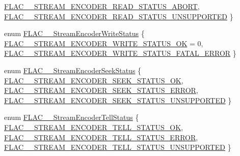 \begin{DoxyCompactItemize}
\mbox{\hyperlink{group__flac__stream__encoder_gga2e81f007fb0a7414c0bbb453f37ea37fa69b94eeab60e07d5fd33f2b3c8b85759}{F\+L\+A\+C\+\_\+\+\_\+\+S\+T\+R\+E\+A\+M\+\_\+\+E\+N\+C\+O\+D\+E\+R\+\_\+\+R\+E\+A\+D\+\_\+\+S\+T\+A\+T\+U\+S\+\_\+\+A\+B\+O\+RT}}, 
\mbox{\hyperlink{group__flac__stream__encoder_gga2e81f007fb0a7414c0bbb453f37ea37fa9bb730b8f6354cc1e810017a2f700316}{F\+L\+A\+C\+\_\+\+\_\+\+S\+T\+R\+E\+A\+M\+\_\+\+E\+N\+C\+O\+D\+E\+R\+\_\+\+R\+E\+A\+D\+\_\+\+S\+T\+A\+T\+U\+S\+\_\+\+U\+N\+S\+U\+P\+P\+O\+R\+T\+ED}}
 \}
\item 
enum \mbox{\hyperlink{group__flac__stream__encoder_ga3737471fd49730bb8cf9b182bdeda05e}{F\+L\+A\+C\+\_\+\+\_\+\+Stream\+Encoder\+Write\+Status}} \{ \mbox{\hyperlink{group__flac__stream__encoder_gga3737471fd49730bb8cf9b182bdeda05ea5622e0199f0203c402fcb7b4ca76f808}{F\+L\+A\+C\+\_\+\+\_\+\+S\+T\+R\+E\+A\+M\+\_\+\+E\+N\+C\+O\+D\+E\+R\+\_\+\+W\+R\+I\+T\+E\+\_\+\+S\+T\+A\+T\+U\+S\+\_\+\+OK}} = 0, 
\mbox{\hyperlink{group__flac__stream__encoder_gga3737471fd49730bb8cf9b182bdeda05ea18e7cd6a443fb8bd303c3ba89946bc85}{F\+L\+A\+C\+\_\+\+\_\+\+S\+T\+R\+E\+A\+M\+\_\+\+E\+N\+C\+O\+D\+E\+R\+\_\+\+W\+R\+I\+T\+E\+\_\+\+S\+T\+A\+T\+U\+S\+\_\+\+F\+A\+T\+A\+L\+\_\+\+E\+R\+R\+OR}}
 \}
\item 
enum \mbox{\hyperlink{group__flac__stream__encoder_ga6d5be3489f45fcf0c252022c65d87aca}{F\+L\+A\+C\+\_\+\+\_\+\+Stream\+Encoder\+Seek\+Status}} \{ \mbox{\hyperlink{group__flac__stream__encoder_gga6d5be3489f45fcf0c252022c65d87acaa99853066610d798627888ec2e5afa667}{F\+L\+A\+C\+\_\+\+\_\+\+S\+T\+R\+E\+A\+M\+\_\+\+E\+N\+C\+O\+D\+E\+R\+\_\+\+S\+E\+E\+K\+\_\+\+S\+T\+A\+T\+U\+S\+\_\+\+OK}}, 
\mbox{\hyperlink{group__flac__stream__encoder_gga6d5be3489f45fcf0c252022c65d87acaabf93227938b4e1bf3656fe4ba4159c60}{F\+L\+A\+C\+\_\+\+\_\+\+S\+T\+R\+E\+A\+M\+\_\+\+E\+N\+C\+O\+D\+E\+R\+\_\+\+S\+E\+E\+K\+\_\+\+S\+T\+A\+T\+U\+S\+\_\+\+E\+R\+R\+OR}}, 
\mbox{\hyperlink{group__flac__stream__encoder_gga6d5be3489f45fcf0c252022c65d87acaa8930179a426134caf30a70147448f037}{F\+L\+A\+C\+\_\+\+\_\+\+S\+T\+R\+E\+A\+M\+\_\+\+E\+N\+C\+O\+D\+E\+R\+\_\+\+S\+E\+E\+K\+\_\+\+S\+T\+A\+T\+U\+S\+\_\+\+U\+N\+S\+U\+P\+P\+O\+R\+T\+ED}}
 \}
\item 
enum \mbox{\hyperlink{group__flac__stream__encoder_gab628f63181250eb977a28bf12b7dd9ff}{F\+L\+A\+C\+\_\+\+\_\+\+Stream\+Encoder\+Tell\+Status}} \{ \mbox{\hyperlink{group__flac__stream__encoder_ggab628f63181250eb977a28bf12b7dd9ffa48e071d89494ac8f5471e7c0d7a6f43b}{F\+L\+A\+C\+\_\+\+\_\+\+S\+T\+R\+E\+A\+M\+\_\+\+E\+N\+C\+O\+D\+E\+R\+\_\+\+T\+E\+L\+L\+\_\+\+S\+T\+A\+T\+U\+S\+\_\+\+OK}}, 
\mbox{\hyperlink{group__flac__stream__encoder_ggab628f63181250eb977a28bf12b7dd9ffaf638882e04d7c58e6c29dcc7f410864b}{F\+L\+A\+C\+\_\+\+\_\+\+S\+T\+R\+E\+A\+M\+\_\+\+E\+N\+C\+O\+D\+E\+R\+\_\+\+T\+E\+L\+L\+\_\+\+S\+T\+A\+T\+U\+S\+\_\+\+E\+R\+R\+OR}}, 
\mbox{\hyperlink{group__flac__stream__encoder_ggab628f63181250eb977a28bf12b7dd9ffa9d6bbd317f85fd2d6fc72f64e3cb56e7}{F\+L\+A\+C\+\_\+\+\_\+\+S\+T\+R\+E\+A\+M\+\_\+\+E\+N\+C\+O\+D\+E\+R\+\_\+\+T\+E\+L\+L\+\_\+\+S\+T\+A\+T\+U\+S\+\_\+\+U\+N\+S\+U\+P\+P\+O\+R\+T\+ED}}
 \}
\end{DoxyCompactItemize}
